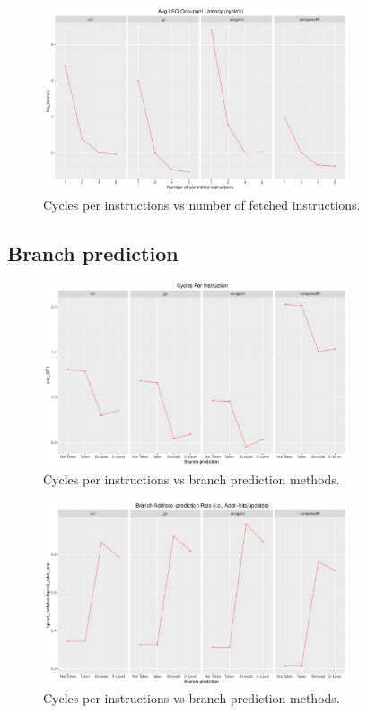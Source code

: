 \documentclass[10pt]{scrartcl}
\begin{document}
\begin{figure}[h]
  \centering
  \includegraphics[width=0.8\textwidth]{Plots/plot_C_lsq_latency}
  \caption{Cycles per instructions vs number of fetched instructions.}\label{fig:c_lsq_latency}
\end{figure}

\FloatBarrier

\subsection{Branch prediction}

\begin{figure}[h]
  \centering
  \includegraphics[width=0.8\textwidth]{Plots/plot_BP_sim_CPI}
  \caption{Cycles per instructions vs branch prediction methods.}\label{fig:bp_sim_cpi}
\end{figure}

\begin{figure}[h]
  \centering
  \includegraphics[width=0.8\textwidth]{Plots/plot_BP_bpred_addr_rate}
  \caption{Cycles per instructions vs branch prediction methods.}\label{fig:bp_addr-pred-rate}
\end{figure}
\end{document}
